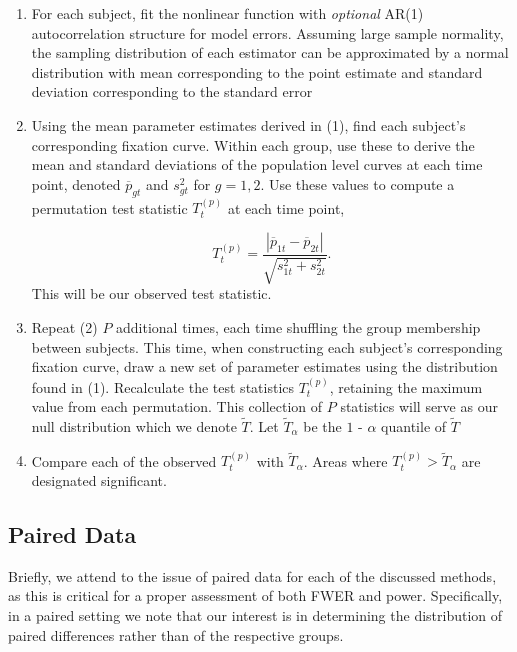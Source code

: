 \begin{enumerate}
\vspace{-2mm}
\item For each subject, fit the nonlinear function with \textit{optional} AR(1) autocorrelation structure for model errors. Assuming large sample normality, the sampling distribution of each estimator can be approximated by a normal distribution with mean corresponding to the point estimate and standard deviation corresponding to the standard error
\item Using the mean parameter estimates derived in (1), find each subject's corresponding fixation curve. Within each group, use these to derive the mean and standard deviations of the population level curves at each time point, denoted $\overline{p}_{gt}$ and $s_{gt}^2$ for $g = 1,2$. Use these values to compute a permutation test statistic $T_t^{(p)}$ at each time point,

\begin{equation}
T_t^{(p)} = \frac{|\overline{p}_{1t} - \overline{p}_{2t}|}{\sqrt{s_{1t}^2 + s_{2t}^2}}.
\end{equation}
This will be our observed test statistic.
\item Repeat (2) $P$  additional times, each time shuffling the group membership between subjects. This time, when constructing each subject's corresponding fixation curve, draw a new set of parameter estimates using the distribution found in (1). Recalculate the test statistics $T_t^{(p)}$, retaining the maximum value from each permutation. This collection of $P$ statistics will serve as our null distribution which we denote $\widetilde{T}$. Let $\widetilde{T}_{\alpha}$ be the $1$ - $\alpha$ quantile of $\widetilde{T}$
\item Compare each of the observed $T_t^{(p)}$ with $\widetilde{T}_{\alpha}$. Areas where $T_t^{(p)} > \widetilde{T}_{\alpha}$ are designated significant. 
\end{enumerate}



\subsection{Paired Data}

Briefly, we attend to the issue of paired data for each of the discussed methods, as this is critical for a proper assessment of both FWER and power. Specifically, in a paired setting we note that our interest is in determining the distribution of paired differences rather than of the respective groups. 

